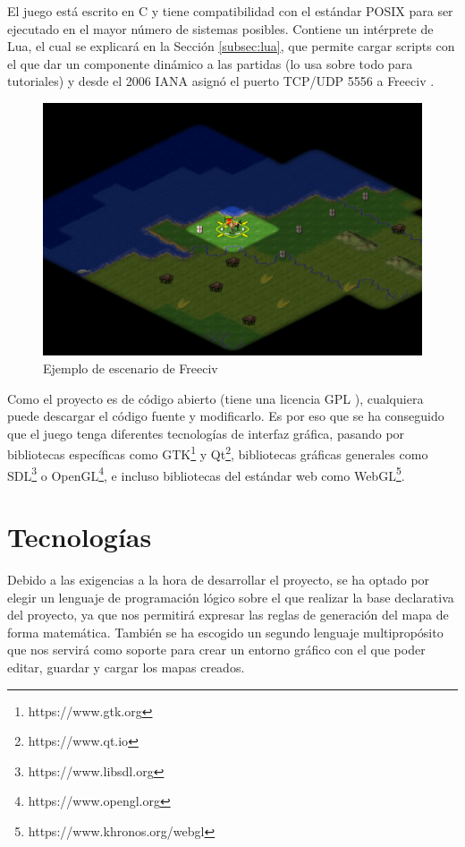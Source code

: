 El juego está escrito en C y tiene compatibilidad con el estándar POSIX para ser ejecutado en el mayor número de sistemas posibles. Contiene un intérprete de Lua, el cual se explicará en la Sección \ref{subsec:lua}, que permite cargar scripts con el que dar un componente dinámico a las partidas (lo usa sobre todo para tutoriales) y desde el 2006 IANA asignó el puerto TCP/UDP 5556 a Freeciv \cite{iana_2006}.

\begin{figure}[!h]
	\centering
	\includegraphics[width=.75\textwidth]{images/freeciv.png}
	\caption{Ejemplo de escenario de Freeciv}
	\label{fig:freeciv}
\end{figure}

Como el proyecto es de código abierto (tiene una licencia GPL \cite{gplv3}), cualquiera puede descargar el código fuente y modificarlo. Es por eso que se ha conseguido que el juego tenga diferentes tecnologías de interfaz gráfica, pasando por bibliotecas específicas como GTK\footnote{https://www.gtk.org} y Qt\footnote{https://www.qt.io}, bibliotecas gráficas generales como SDL\footnote{https://www.libsdl.org} o OpenGL\footnote{https://www.opengl.org}, e incluso bibliotecas del estándar web como WebGL\footnote{https://www.khronos.org/webgl}.

\section{Tecnologías}

Debido a las exigencias a la hora de desarrollar el proyecto, se ha optado por elegir un lenguaje de programación lógico sobre el que realizar la base declarativa del proyecto, ya que nos permitirá expresar las reglas de generación del mapa de forma matemática. También se ha escogido un segundo lenguaje multipropósito que nos servirá como soporte para crear un entorno gráfico con el que poder editar, guardar y cargar los mapas creados.

